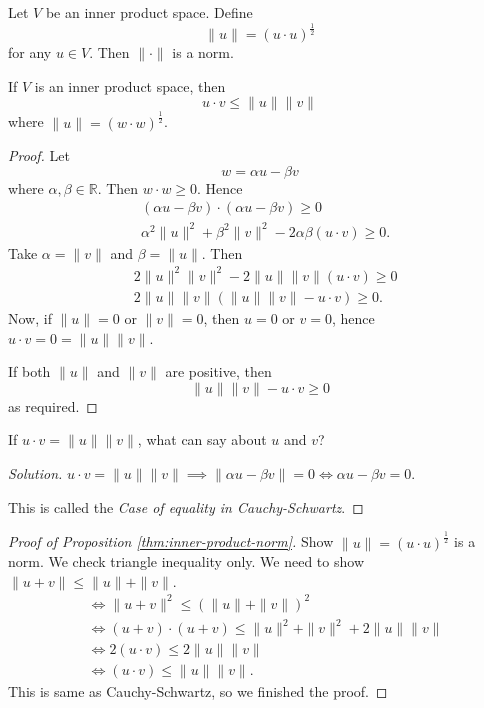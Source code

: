 \begin{proposition}
	\label{thm:inner-product-norm}
	Let $V $ be an inner product space. Define \[
		\|u\| = \left( u \cdot u \right) ^{\frac{1}{2}}
	\]  for any $u \in V$. Then $\|\cdot\|$ is a norm.
\end{proposition}

\begin{lemma}
	If $V$ is an inner product space, then \[
		u \cdot v \le  \| u\| \| v\|
	\] where $\| u\| = (w \cdot w) ^{\frac{1}{2}}$.
\end{lemma}
\begin{proof}
	Let \[
		w = \alpha u - \beta v
	\] where $\alpha, \beta \in \mathbb{R}$. Then $w \cdot w \ge  0$. Hence
	\begin{align*}
		&(\alpha u - \beta v)\cdot(\alpha u - \beta v) \ge  0 \\
		&\alpha^2 \|u\|^2 + \beta^2 \|v\|^2 - 2 \alpha \beta (u \cdot v) \ge  0
	.\end{align*}
	Take $\alpha = \|v\|$ and $\beta = \|u\|$. Then \begin{align*}
		&2 \|u\|^2 \|v\|^2 - 2 \|u\| \|v\| (u \cdot v) \ge 0\\
		&2 \|u\| \|v\|\left( \|u\|\|v\|- u\cdot v \right) \ge  0
	.\end{align*} 
	Now, if $\|u\| = 0$ or $\|v\|=0$, then $u = 0$ or $v = 0$, hence $u \cdot v = 0 =  \|u\| \|v\|$.

	If both $\|u\|$ and $\|v\|$ are positive, then \[
		 \|u\|\|v\|- u\cdot v \ge 0
	\] as required.
\end{proof}

\begin{problem}
	If $u \cdot v = \| u\| \|v\|$, what can say about $u$ and $v$?
\end{problem}

\begin{proof}[Solution]
	$u \cdot v = \|u\|\|v\| \implies \|\alpha u - \beta v\| = 0 \iff \alpha u - \beta v = 0$.

	This is called the \textit{Case of equality in Cauchy-Schwartz}.
\end{proof}

\begin{proof}[Proof of Proposition \ref{thm:inner-product-norm}]
	Show $\|u\| = \left( u\cdot u \right) ^{\frac{1}{2}}$ is a norm. We check triangle inequality only.
We need to show $\|u+v\| \le  \|u\| + \|v\|$.
\begin{align*}
	&\iff \|u+v\|^2 \le  \left( \|u\| + \|v\| \right) ^2 \\
	&\iff \left( u+v \right) \cdot (u+v) \le  \|u\|^2 + \|v\|^2 + 2 \|u\|\|v\|\\
	&\iff  2 (u\cdot v) \le  2 \|u\|\|v\|\\
	&\iff   (u\cdot v) \le   \|u\|\|v\|
.\end{align*}
This is same as Cauchy-Schwartz, so we finished the proof.
\end{proof}


